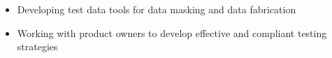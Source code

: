 \begin{itemize}
    \item Developing test data tools for data masking and data fabrication
    \item Working with product owners to develop effective and compliant testing strategies  
\end{itemize}